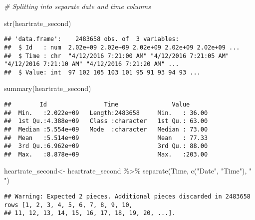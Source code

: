 \documentclass[
]{article}
\newenvironment{Shaded}{\begin{snugshade}}{\end{snugshade}}
\newcommand{\CommentTok}[1]{\textcolor[rgb]{0.56,0.35,0.01}{\textit{#1}}}
\newcommand{\FunctionTok}[1]{\textcolor[rgb]{0.00,0.00,0.00}{#1}}
\newcommand{\NormalTok}[1]{#1}
\newcommand{\OtherTok}[1]{\textcolor[rgb]{0.56,0.35,0.01}{#1}}
\newcommand{\SpecialCharTok}[1]{\textcolor[rgb]{0.00,0.00,0.00}{#1}}
\newcommand{\StringTok}[1]{\textcolor[rgb]{0.31,0.60,0.02}{#1}}
\begin{document}
\begin{Shaded}
\begin{Highlighting}[]
\CommentTok{\# Splitting into separate date and time columns}

\FunctionTok{str}\NormalTok{(heartrate\_second)}
\end{Highlighting}
\end{Shaded}

\begin{verbatim}
## 'data.frame':    2483658 obs. of  3 variables:
##  $ Id   : num  2.02e+09 2.02e+09 2.02e+09 2.02e+09 2.02e+09 ...
##  $ Time : chr  "4/12/2016 7:21:00 AM" "4/12/2016 7:21:05 AM" "4/12/2016 7:21:10 AM" "4/12/2016 7:21:20 AM" ...
##  $ Value: int  97 102 105 103 101 95 91 93 94 93 ...
\end{verbatim}

\begin{Shaded}
\begin{Highlighting}[]
\FunctionTok{summary}\NormalTok{(heartrate\_second)}
\end{Highlighting}
\end{Shaded}

\begin{verbatim}
##        Id                Time               Value       
##  Min.   :2.022e+09   Length:2483658     Min.   : 36.00  
##  1st Qu.:4.388e+09   Class :character   1st Qu.: 63.00  
##  Median :5.554e+09   Mode  :character   Median : 73.00  
##  Mean   :5.514e+09                      Mean   : 77.33  
##  3rd Qu.:6.962e+09                      3rd Qu.: 88.00  
##  Max.   :8.878e+09                      Max.   :203.00
\end{verbatim}

\begin{Shaded}
\begin{Highlighting}[]
\NormalTok{heartrate\_second}\OtherTok{\textless{}{-}} 
\NormalTok{  heartrate\_second }\SpecialCharTok{\%\textgreater{}\%}
  \FunctionTok{separate}\NormalTok{(Time, }\FunctionTok{c}\NormalTok{(}\StringTok{"Date"}\NormalTok{, }\StringTok{"Time"}\NormalTok{), }\StringTok{" "}\NormalTok{)}
\end{Highlighting}
\end{Shaded}

\begin{verbatim}
## Warning: Expected 2 pieces. Additional pieces discarded in 2483658 rows [1, 2, 3, 4, 5, 6, 7, 8, 9, 10,
## 11, 12, 13, 14, 15, 16, 17, 18, 19, 20, ...].
\end{verbatim}
\end{document}
